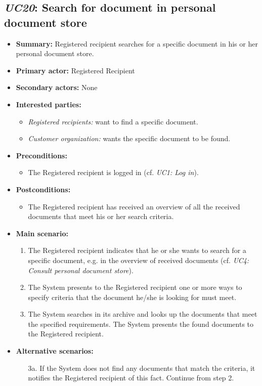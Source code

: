 \documentclass[a4paper,10pt]{article}
\begin{document}
\subsection{\emph{UC20}: Search for document in personal document store}
\begin{itemize}
    \item \textbf{Summary:} Registered recipient searches for a specific document in his or her personal document store. 
    \item \textbf{Primary actor:} Registered Recipient
	\item \textbf{Secondary actors:} None
    \item \textbf{Interested parties:} 
        \begin{itemize}
        	\item \textit{Registered recipients:} want to find a specific document.
            \item \textit{Customer organization:} wants the specific document to be found.
        \end{itemize}

    \item \textbf{Preconditions:}
        \begin{itemize}
            \item The Registered recipient is logged in (cf. \emph{UC1: Log in}).
        \end{itemize}

    \item \textbf{Postconditions:}
        \begin{itemize}
            \item The Registered recipient has received an overview of all the received documents that meet his or her search criteria.
        \end{itemize}
        
    \item \textbf{Main scenario:} 
    \begin{enumerate}
       \item The Registered recipient indicates that he or she wants to search for a specific document, e.g. in the overview of received documents (cf. \emph{UC4: Consult personal document store}).
       \item The System presents to the Registered recipient one or more ways to specify criteria that the document he/she is looking for must meet.
       \item The System searches in its archive and looks up the documents that meet the specified requirements. The System presents the found documents to the Registered recipient.
     \end{enumerate}

    \item \textbf{Alternative scenarios:} 
    \begin{enumerate}
        \item [3a.] If the System does not find any documents that match the criteria, it notifies the Registered recipient of this fact. Continue from step 2.
    \end{enumerate}
\end{itemize}
\end{document}
